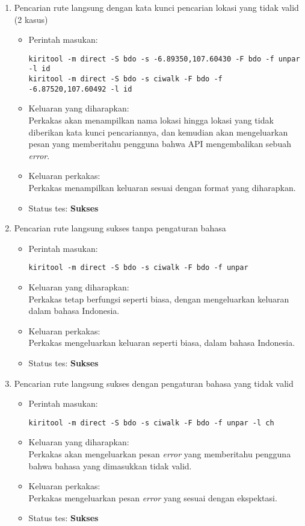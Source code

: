 \begin{enumerate}
	\item Pencarian rute langsung dengan kata kunci pencarian lokasi yang tidak valid (2 kasus)
	\begin{itemize}
		\item Perintah masukan:
		\begin{verbatim}
kiritool -m direct -S bdo -s -6.89350,107.60430 -F bdo -f unpar -l id
kiritool -m direct -S bdo -s ciwalk -F bdo -f -6.87520,107.60492 -l id
		\end{verbatim}
		\item Keluaran yang diharapkan: \\
		Perkakas akan menampilkan nama lokasi hingga lokasi yang tidak diberikan kata kunci pencariannya, dan kemudian akan mengeluarkan pesan yang memberitahu pengguna bahwa API mengembalikan sebuah \textit{error}.
		\item Keluaran perkakas: \\
		Perkakas menampilkan keluaran sesuai dengan format yang diharapkan.
		\item Status tes: \textbf{Sukses}
	\end{itemize}
	
	\item Pencarian rute langsung sukses tanpa pengaturan bahasa
	\begin{itemize}
		\item Perintah masukan:
		\begin{verbatim}
kiritool -m direct -S bdo -s ciwalk -F bdo -f unpar
		\end{verbatim}
		\item Keluaran yang diharapkan: \\
		Perkakas tetap berfungsi seperti biasa, dengan mengeluarkan keluaran dalam bahasa Indonesia.
		\item Keluaran perkakas: \\
		Perkakas mengeluarkan keluaran seperti biasa, dalam bahasa Indonesia.
		\item Status tes: \textbf{Sukses}
	\end{itemize}
	
	\item Pencarian rute langsung sukses dengan pengaturan bahasa yang tidak valid
	\begin{itemize}
		\item Perintah masukan:
		\begin{verbatim}
kiritool -m direct -S bdo -s ciwalk -F bdo -f unpar -l ch
		\end{verbatim}
		\item Keluaran yang diharapkan: \\
		Perkakas akan mengeluarkan pesan \textit{error} yang memberitahu pengguna bahwa bahasa yang dimasukkan tidak valid.
		\item Keluaran perkakas: \\
		Perkakas mengeluarkan pesan \textit{error} yang sesuai dengan ekspektasi.
		\item Status tes: \textbf{Sukses}
	\end{itemize}
	
\end{enumerate}